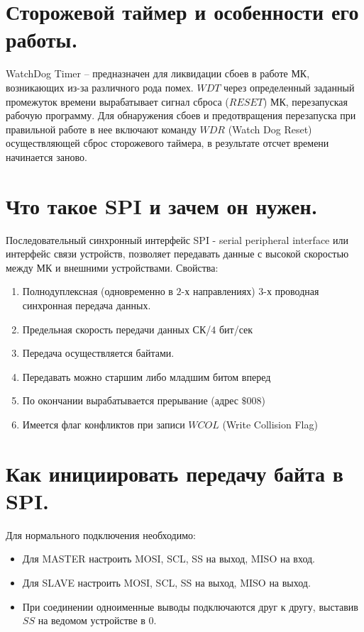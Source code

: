 \section{Сторожевой таймер и особенности его работы.}

WatchDog Timer – предназначен для ликвидации сбоев в работе МК, возникающих из-за различного
рода помех. $WDT$ через определенный заданный промежуток времени вырабатывает сигнал сброса 
($RESET$) МК, перезапуская рабочую программу. Для обнаружения сбоев и предотвращения 
перезапуска при правильной работе в нее включают команду $WDR$ (Watch Dog Reset) 
осуществляющей сброс сторожевого таймера, в результате отсчет времени начинается заново.

\section{Что такое SPI и зачем он нужен.}

Последовательный синхронный интерфейс SPI - serial peripheral interface или интерфейс связи
устройств, позволяет передавать данные с высокой скоростью между МК и внешними устройствами.
Свойства:
\begin{enumerate}
  \item Полнодуплексная (одновременно в $2$-х направлениях) $3$-х проводная синхронная
        передача данных. 
  \item Предельная скорость передачи данных СК/$4$ бит/сек 
  \item Передача осуществляется байтами.
  \item Передавать можно старшим либо младшим битом вперед  
  \item По окончании вырабатывается прерывание (адрес $\$008$) 
  \item Имеется флаг конфликтов при записи $WCOL$ (Write Collision Flag) 
\end{enumerate}	

\section{Как инициировать передачу байта в SPI.}

Для нормального подключения необходимо:
\begin{itemize}
  \item Для MASTER настроить MOSI, SCL, SS на выход, MISO на вход.
  \item Для SLAVE настроить MOSI, SCL, SS на выход, MISO на выход.
  \item При соединении одноименные выводы подключаются друг к другу, выставив $SS$ на ведомом 
        устройстве в $0$. 
\end{itemize}

